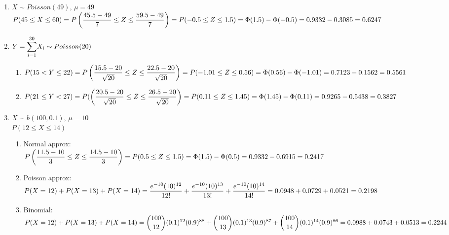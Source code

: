 \documentclass{article}
\newcommand\lsum{\mathlarger{\sum}}
\newcommand\myskip[1]{\addtocounter{enumi}{#1}}
\begin{document}
\begin{enumerate}
     \item
      $X \sim Poisson(49)$, $\mu = 49$ \\
      $P(45 \le X \le 60) = P\left(\dfrac{45.5 - 49}{7} \le Z \le \dfrac{59.5 - 49}{7}\right)
	= P(-0.5 \le Z \le 1.5) \\ = \Phi(1.5) - \Phi(-0.5) = 0.9332 - 0.3085 = 0.6247$
     \myskip{1}
     
     \item
      $Y = \lsum_{i=1}^{30} {X_i} \sim Poisson(20)$
      \begin{enumerate}
       \item 
	$P(15 < Y \le 22) = P\left(\dfrac{15.5-20}{\sqrt{20}} \le Z \le \dfrac{22.5-20}{\sqrt{20}}\right)
	  = P(-1.01 \le Z \le 0.56) \\ = \Phi(0.56) - \Phi(-1.01) = 0.7123 - 0.1562 = 0.5561$
       
       \item
	$P(21 \le Y < 27) = P(\left(\dfrac{20.5-20}{\sqrt{20}} \le Z \le \dfrac{26.5-20}{\sqrt{20}}\right)
	  = P(0.11 \le Z \le 1.45) \\ = \Phi(1.45) - \Phi(0.11) = 0.9265 - 0.5438 = 0.3827$
      \end{enumerate}
     \myskip{2}
     
     \item
      $X \sim b(100, 0.1)$, $\mu = 10$ \\
      $P(12 \le X \le 14)$
      \begin{enumerate}
       \item 
	Normal approx: \\
	$P\left(\dfrac{11.5 - 10}{3} \le Z \le \dfrac{14.5 - 10}{3}\right)
	  = P(0.5 \le Z \le 1.5) \\ = \Phi(1.5) - \Phi(0.5) = 0.9332 - 0.6915 = 0.2417$
       
       \item
	Poisson approx: \\
	$P(X = 12) + P(X = 13) + P(X = 14) = \dfrac{e^{-10}(10)^{12}}{12!} + 
	    \dfrac{e^{-10}(10)^{13}}{13!} + \dfrac{e^{-10}(10)^{14}}{14!} \\
	    = 0.0948 + 0.0729 + 0.0521 = 0.2198$
       
       \item
	Binomial: \\
	$P(X = 12) + P(X = 13) + P(X = 14) = \dbinom{100}{12}(0.1)^{12}(0.9)^{88} +
	    \dbinom{100}{13}(0.1)^{13}(0.9)^{87} + \dbinom{100}{14}(0.1)^{14}(0.9)^{86} 
	    = 0.0988 + 0.0743 + 0.0513 = 0.2244$
      \end{enumerate}

    \end{enumerate}
\end{document}
